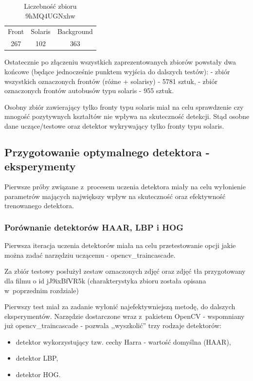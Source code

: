 \begin{table}[!h]
    \centering
    \begin{tabular}{c|c|c}
        Front   & Solaris   & Background \\
        267     & 102       & 363 
    \end{tabular}
    \caption{Liczebność zbioru 9hMQ4UGNxhw}
    \label{tab:9hMQ4UGNxhw_count}
\end{table}

Ostatecznie po złączeniu wszystkich zaprezentowanych zbiorów powstały
dwa końcowe (będące jednocześnie punktem wyjścia do dalszych testów):
- zbiór wszystkich oznaczonych frontów (różne + solarisy) - 5781 sztuk,
- zbiór oznaczonych frontów autobusów typu solaris - 955 sztuk.

Osobny zbiór zawierający tylko fronty typu solaris miał na celu
sprawdzenie czy mnogość pozytywnych kształtów nie wpływa na skuteczność
detekcji. Stąd osobne dane uczące/testowe oraz detektor wykrywający 
tylko fronty typu solaris.

\subsection{Przygotowanie optymalnego detektora - eksperymenty}

Pierwsze próby związane z~procesem uczenia detektora miały na celu 
wyłonienie parametrów mających największy wpływ na skuteczność 
oraz efektywność trenowanego detektora.

\subsubsection{Porównanie detektorów HAAR, LBP i HOG}

Pierwsza iteracja uczenia detektorów miała na celu przetestowanie
opcji jakie można zadać narzędziu uczącemu - opencv\_traincascade.

Za zbiór testowy posłużył zestaw oznaczonych zdjęć oraz zdjęć tła
przygotowany dla filmu o id jJ9ixBfVR5k (charakterystyka zbioru
została opisana w~poprzednim rozdziale)

Pierwszy test miał za zadanie wyłonić najefektywniejszą metodę, do dalszych
eksperymentów. Narzędzie dostarczone wraz z~pakietem OpenCV - wspomniany
już opencv\_traincascade - pozwala ,,wyszkolić'' trzy rodzaje
detektorów:

\begin{itemize}
    \item detektor wykorzystujący tzw. cechy Harra - wartość 
        domyślna (HAAR),
    \item detektor LBP,
    \item detektor HOG.
\end{itemize}

